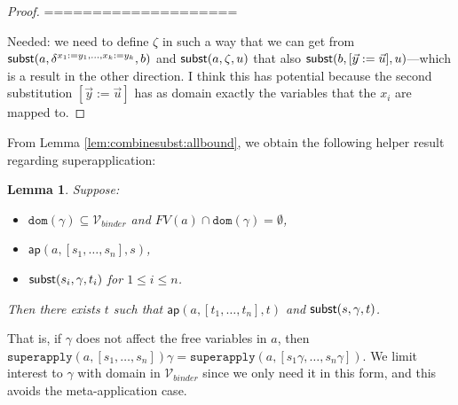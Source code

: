 \documentclass{lmcs}
\theoremstyle{theorem}\newtheorem{theorem}{Theorem}
\theoremstyle{theorem}\newtheorem{lemma}[theorem]{Lemma}
\theoremstyle{theorem}\newtheorem{corollary}[theorem]{Corollary}
\theoremstyle{definition}\newtheorem{definition}[theorem]{Definition}
\theoremstyle{definition}\newtheorem{example}[theorem]{Example}
\newcommand{\Vbound}{\mathcal{V}_{\mathit{binder}}}
\newcommand{\FV}{\mathit{FV}}
\newcommand{\domain}{\mathtt{dom}}
\newcommand{\avar}{x}
\newcommand{\bvar}{y}
\newcommand{\superapply}{\mathtt{superapply}}
\begin{document}
\begin{proof}
====================

Needed: we need to define $\zeta$ in such a way that we can get from
$\subrel{a,\delta^{\avar_1:=\bvar_1,\dots,\avar_k:=\bvar_k},b}$ and
$\mathsf{subst}(a,\zeta,u)$ that also $\mathsf{subst}(b,[\vec{y}:=\vec{u}],u)$---which is a
result in the other direction.  I think this has potential because the second
substitution $[\vec{\bvar}:=\vec{u}]$ has as domain exactly the variables that
the $\avar_i$ are mapped to.
\end{proof}

\newcommand{\aprel}[1]{\mathsf{ap}(#1)}

From Lemma \ref{lem:combinesubst:allbound}, we obtain the following helper result regarding superapplication:

\begin{lemma}\label{lem:boundsubsthelper}
Suppose:
\begin{itemize}
\item $\domain(\gamma) \subseteq \Vbound$ and $\FV(a) \cap \domain(\gamma) = \emptyset$,
\item $\aprel{a, [s_1,\dots,s_n], s}$,
\item $\mathsf{subst}(s_i,\gamma,t_i)$ for $1 \leq i \leq n$.
\end{itemize}
Then there exists $t$ such that $\aprel{a,[t_1,\dots,t_n],t}$ and $\mathsf{subst}(s,\gamma,t)$.
\end{lemma}

That is, if $\gamma$ does not affect the free variables in $a$, then
$\superapply(a,[s_1,\dots,s_n])\gamma = \superapply(a,[s_1\gamma,\dots,s_n\gamma])$.
We limit interest to $\gamma$ with domain in $\Vbound$ since we only need it in this form,
and this avoids the meta-application case.
\end{document}
